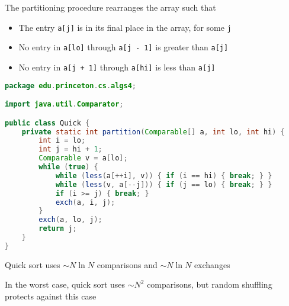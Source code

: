 \documentclass[8pt,a4paper,compress]{beamer}
\begin{document}
\begin{frame}[fragile]
\pause

The partitioning procedure rearranges the array such that
\begin{itemize}
\item The entry \lstinline{a[j]} is in its final place in the array, for some \lstinline{j}
\item No entry in \lstinline{a[lo]} through \lstinline{a[j - 1]} is greater than \lstinline{a[j]}
\item No entry in \lstinline{a[j + 1]} through \lstinline{a[hi]} is less than \lstinline{a[j]}
\end{itemize}

\pause
\bigskip

\begin{lstlisting}[language=Java]
package edu.princeton.cs.algs4;

import java.util.Comparator;

public class Quick {
    private static int partition(Comparable[] a, int lo, int hi) {
        int i = lo;
        int j = hi + 1;
        Comparable v = a[lo];
        while (true) { 
            while (less(a[++i], v)) { if (i == hi) { break; } }
            while (less(v, a[--j])) { if (j == lo) { break; } }
            if (i >= j) { break; }
            exch(a, i, j);
        }
        exch(a, lo, j);
        return j;
    }
}
\end{lstlisting}
\end{frame}

\begin{frame}[fragile]
\pause

Trace of partition operation
\begin{center}
}
\end{center}
\end{frame}

\begin{frame}[fragile]
\pause

Quick sort uses $\sim N\ln N$ comparisons and $\sim N\ln N$ exchanges

\pause
\bigskip

In the worst case, quick sort uses $\sim N^2$ comparisons, but random shuffling protects against this case
\end{frame}
\end{document}
